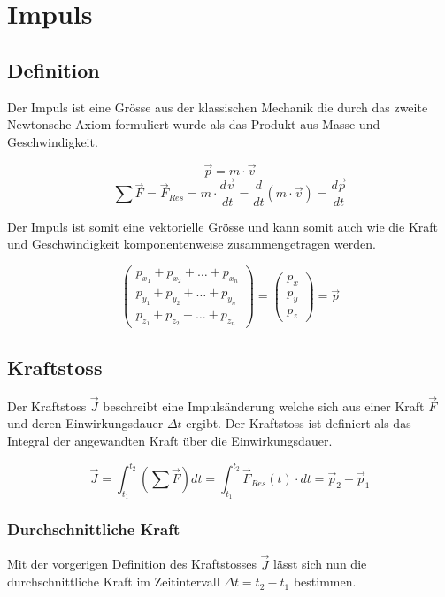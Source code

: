 \chapter{Impuls}

\newpage
\section{Definition}
Der Impuls ist eine Grösse aus der klassischen Mechanik die durch das zweite
Newtonsche Axiom formuliert wurde als das Produkt aus Masse und 
Geschwindigkeit.

\[ \boxed{\vec{p}=m \cdot \vec{v}}  \] 
\[ \sum\vec{F}=\vec{F}_{Res} = m \cdot \frac{d\vec{v}}{dt} =
	\frac{d}{dt}(m \cdot \vec{v}) = \frac{d\vec{p}}{dt}  \]

\noindent
Der Impuls ist somit eine vektorielle Grösse und kann somit auch wie die
Kraft und Geschwindigkeit komponentenweise zusammengetragen werden.

\[\begin{pmatrix} 
	p_{x_1} + p_{x_2} + \dots + p_{x_n} \\
	p_{y_1} + p_{y_2} + \dots + p_{y_n} \\
	p_{z_1} + p_{z_2} + \dots + p_{z_n} 
\end{pmatrix}
=
\begin{pmatrix}
	p_x \\
	p_y \\
	p_z
\end{pmatrix}
= \vec{p}  \]

\section{Kraftstoss}
Der Kraftstoss $\vec{J}$ beschreibt eine Impulsänderung welche sich aus einer 
Kraft $\vec{F}$ und deren Einwirkungsdauer $\Delta t$ ergibt. Der Kraftstoss 
ist definiert als das Integral der angewandten Kraft über die Einwirkungsdauer.

\[ \boxed{\vec{J} = \int_{t_1}^{t_2} \left(\sum \vec{F} \right) dt =
	\int_{t_1}^{t_2}\vec{F}_{Res}(t)\cdot dt = \vec{p}_2 - \vec{p}_1} \]

\subsection{Durchschnittliche Kraft}
Mit der vorgerigen Definition des Kraftstosses $\vec{J}$ lässt sich nun die
durchschnittliche Kraft im Zeitintervall $\Delta t = t_2 - t_1$ bestimmen.

